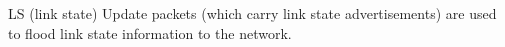LS (link state) Update packets (which carry link state advertisements) are used to flood link state information to the network.
